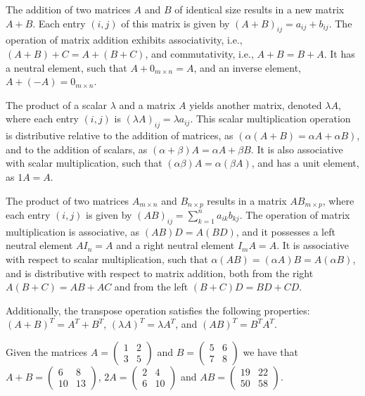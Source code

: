The addition of two matrices $A$ and $B$ of identical size results in a new matrix $A + B$. Each entry $(i, j)$ of this matrix is given by $(A + B)_{ij} = a_{ij} + b_{ij}$. The operation of matrix addition exhibits associativity, i.e., $(A + B) + C = A + (B + C)$, and commutativity, i.e., $A + B = B + A$. It has a neutral element, such that $A + 0_{m \times n} = A$, and an inverse element, $A + (-A) = 0_{m \times n}$.

The product of a scalar $\lambda$ and a matrix $A$ yields another matrix, denoted $\lambda A$, where each entry $(i, j)$ is $(\lambda A)_{ij} = \lambda a_{ij}$. This scalar multiplication operation is distributive relative to the addition of matrices, as $(\alpha (A + B) = \alpha A + \alpha B)$, and to the addition of scalars, as $(\alpha + \beta) A = \alpha A + \beta B$. It is also associative with scalar multiplication, such that $(\alpha \beta) A = \alpha (\beta A)$, and has a unit element, as $1 A = A$.

The product of two matrices $A_{m \times n}$ and $B_{n \times p}$ results in a matrix $AB_{m \times p}$, where each entry $(i, j)$ is given by $(AB)_{ij} = \sum_{k=1}^n a_{ik} b_{kj}$. The operation of matrix multiplication is associative, as $(A B) D = A (B D)$, and it possesses a left neutral element $A I_n = A$ and a right neutral element $I_m A = A$. It is associative with respect to scalar multiplication, such that $\alpha (A B) = (\alpha A) B = A (\alpha B)$, and is distributive with respect to matrix addition, both from the right $A (B + C) = AB + AC$ and from the left $(B + C) D = B D + C D$. 

Additionally, the transpose operation satisfies the following properties: $(A + B)^T = A^T + B^T$, $(\lambda A)^T = \lambda A^T$, and $(A B)^T = B^T A^T$.

\begin{example}
Given the matrices $A = \left( \begin{smallmatrix} 1 & 2 \\ 3 & 5 \end{smallmatrix} \right)$ and $B = \left( \begin{smallmatrix} 5 & 6 \\ 7 & 8 \end{smallmatrix} \right)$ we have that $A + B = \left( \begin{smallmatrix} 6 & 8 \\ 10 & 13 \end{smallmatrix} \right)$, $2 A = \left( \begin{smallmatrix} 2 & 4 \\ 6 & 10 \end{smallmatrix} \right)$ and $A B = \left( \begin{smallmatrix} 19 & 22 \\ 50 & 58 \end{smallmatrix} \right)$.
\end{example}

